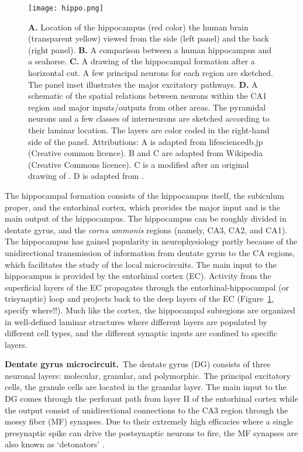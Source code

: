     \begin{figure}
      \center
      \texttt{[image: hippo.png]}
      \caption{
        {\bf A.} Location of the hippocampus (red color) the human brain
        (transparent yellow) viewed from the side (left panel) and the back
        (right panel).
        {\bf B.} A comparison between a human hippocampus and a seahorse.
        {\bf C.} A drawing of the hippocampal formation after a horizontal cut.
        A few principal neurons for each region are sketched. The panel inset
        illustrates the major excitatory pathways.
        {\bf D.} A schematic of the spatial relations between neurons within
        the CA1 region and major inputs/outputs from other areas. The pyramidal
        neurons and a few classes of interneurons are sketched according to
        their laminar location. The layers are color coded in the right-hand
        side of the panel.
        Attributions:
        A is adapted from lifesciencedb.jp (Creative common licence). B and C
        are adapted from Wikipedia (Creative Commons licence). C is a modified
        after an original drawing of \cite{Cajal1911}. D is adapted from
        \cite{Somogyi2014}.
             }
    \label{fig:hp}
    \end{figure}

    The hippocampal formation consists of the hippocampus itself, the
    subiculum proper, and the entorhinal cortex,
    which provides the major input and is the main output of the hippocampus.
    The hippocampus can be roughly divided in dentate gyrus, and the {\it cornu
    ammonis} regions (namely, CA3, CA2, and CA1). The hippocampus has gained
    popularity in neurophysiology partly because of the unidirectional
    transmission of information from dentate gyrus to the CA regions, which
    facilitates the study of the local microcircuits. The main input to the
    hippocampus is provided by the entorhinal cortex (EC). Activity from the
    superficial layers of the EC propagates through the entorhinal-hippocampal
    (or trisynaptic) loop and projects back to the deep layers of the EC
    (Figure~\ref{fig:hp}, specify where!!). Much like the cortex, the
    hippocampal subregions are organized in well-defined laminar structures
    where different layers are populated by different cell types, and the
    different synaptic inputs are confined to specific layers. 

    \textbf{Dentate gyrus microcircuit.}\,
    The dentate gyrus (DG) consists of three neuronal layers: molecular,
    granular, and polymorphic. The principal excitatory cells, the granule
    cells are located in the granular layer. The main input to the DG comes
    through the perforant path from layer II of the entorhinal cortex
    \citep{Squire1992} while the output consist of unidirectional connections
    to the CA3 region through the mossy fiber (MF) synapses. Due to their
    extremely high efficacies where a single presynaptic spike can drive the
    postsynaptic neurons to fire, the MF synapses are also known as
    `detonators' \citep{Bischofberger2006}.

